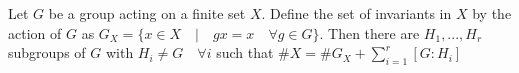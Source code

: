 \documentclass[12pt]{article}
\begin{document}
Let $G$ be a group acting on a finite set $X$. Define the set of invariants in $X$ by the action of $G$ as $G_{X}=\{x \in X  \quad \lvert \quad gx=x \quad \forall g \in G\}$. Then there are $H_{1}, ..., H_{r}$ subgroups of $G$ with $H_{i} \neq G \quad \forall i$ such that
$\#X = \#G_{X} + \sum_{i=1}^{r}[G:H_{i}]$
\end{document}
